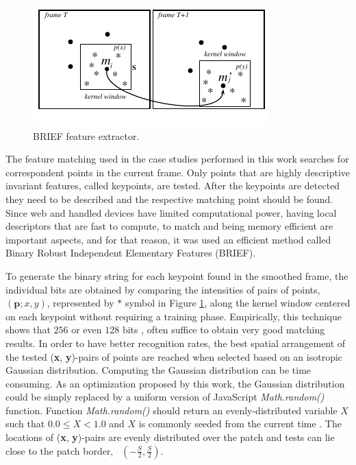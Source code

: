 \begin{figure}[!htb]
  \centering
  \includegraphics[width=\linewidth]{chapters/tracking_library_for_the_web/BRIEF.pdf}
  \caption{BRIEF \cite{Lepetit2005} feature extractor.}
  \label{figure:BRIEF}
\end{figure}

The feature matching used in the case studies performed in this work searches for correspondent points in the current frame. Only points that are highly descriptive invariant features, called keypoints, are tested. After the keypoints are detected they need to be described and the respective matching point should be found. Since web and handled devices have limited computational power, having local descriptors that are fast to compute, to match and being memory efficient are important aspects, and for that reason, it was used an efficient method called Binary Robust Independent Elementary Features (BRIEF).

To generate the binary string for each keypoint found in the smoothed frame, the individual bits are obtained by comparing the intensities of pairs of points, $(\textbf{p}; x, y)$, represented by $\ast$ symbol in Figure \ref{figure:BRIEF}, along the kernel window centered on each keypoint without requiring a training phase.
Empirically, this technique shows that $256$ or even $128$ bits \cite{Calonder2010}, often suffice to obtain very good matching results. In order to have better recognition rates, the best spatial arrangement of the tested (\textbf{x}, \textbf{y})-pairs of points are reached when selected based on an isotropic Gaussian distribution. Computing the Gaussian distribution can be time consuming. As an optimization proposed by this work, the Gaussian distribution could be simply replaced by a uniform version of JavaScript \textit{Math.random()} function. Function \textit{Math.random()} should return an evenly-distributed variable $X$ such that $0.0 \le X < 1.0$ and $X$ is commonly seeded from the current time \cite{International2009}. The locations of (\textbf{x}, \textbf{y})-pairs are evenly distributed over the patch and tests can lie close to the patch border, \ie\ $(-\frac{S}{2},\frac{S}{2})$.

